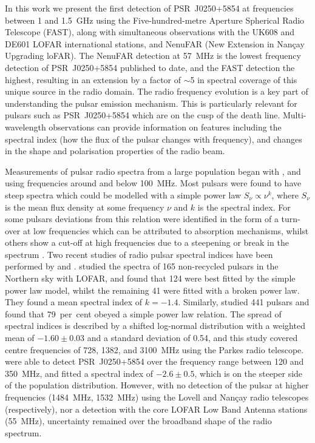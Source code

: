 In this work we present the first detection of PSR~J0250+5854 at frequencies between 1 and 1.5~GHz using the Five-hundred-metre Aperture Spherical Radio Telescope (FAST), along with simultaneous observations with the UK608 and DE601 LOFAR international stations, and NenuFAR (New Extension in Nan\c{c}ay Upgrading loFAR). The NenuFAR detection at 57~MHz is the lowest frequency detection of PSR~J0250+5854 published to date, and the FAST detection the highest, resulting in an extension by a factor of $\sim$5 in spectral coverage of this unique source in the radio domain. The radio frequency evolution is a key part of understanding the pulsar emission mechanism. This is particularly relevant for pulsars such as PSR~J0250+5854 which are on the cusp of the death line. Multi-wavelength observations can provide information on features including the spectral index (how the flux of the pulsar changes with frequency), and changes in the shape and polarisation properties of the radio beam.

Measurements of pulsar radio spectra from a large population began with \citet{Sxxx1973}, \citet{MMxx1980} and \citet{IKMS1981} using frequencies around and below 100~MHz. Most pulsars were found to have steep spectra which could be modelled with a simple power law $S_\nu \propto \nu^k$, where $S_\nu$ is the mean flux density at some frequency $\nu$ and $k$ is the spectral index. For some pulsars deviations from this relation were identified in the form of a turn-over at low frequencies which can be attributed to absorption mechanisms, whilst others show a cut-off at high frequencies due to a steepening or break in the spectrum \citep{Sxxx1973}. Two recent studies of radio pulsar spectral indices have been performed by \citet{BKK+2016} and \citet{JSK+2018}. \citet{BKK+2016} studied the spectra of 165 non-recycled pulsars in the Northern sky with LOFAR, and found that 124 were best fitted by the simple power law model, whilst the remaining 41 were fitted with a broken power law. They found a mean spectral index of $k = -1.4$. Similarly, \citet{JSK+2018} studied 441 pulsars and found that 79~per~cent obeyed a simple power law relation. The spread of spectral indices is described by a shifted log-normal distribution with a weighted mean of $-1.60\pm0.03$ and a standard deviation of 0.54, and this study covered centre frequencies of 728, 1382, and 3100~MHz using the Parkes radio telescope. \citet{TBC+2018} were able to detect PSR~J0250+5854 over the frequency range between 120 and 350~MHz, and fitted a spectral index of $-2.6\pm0.5$, which is on the steeper side of the population distribution. However, with no detection of the pulsar at higher frequencies (1484~MHz, 1532~MHz) using the Lovell and Nan\c{c}ay radio telescopes (respectively), nor a detection with the core LOFAR Low Band Antenna stations (55~MHz), uncertainty remained over the broadband shape of the radio spectrum. 

